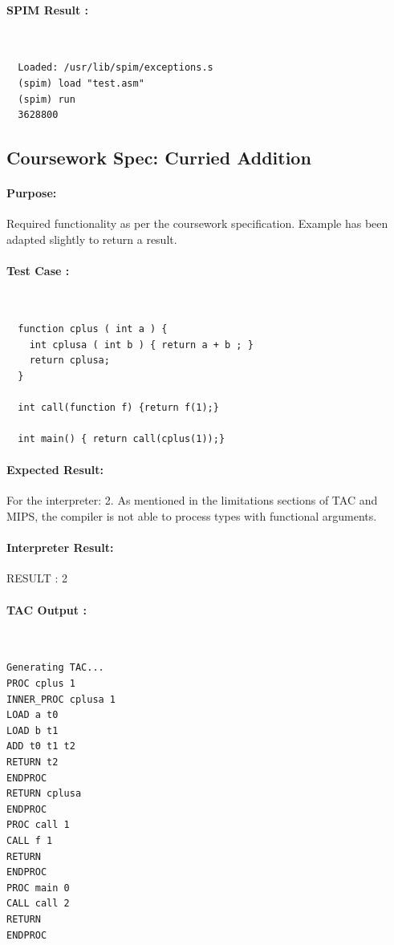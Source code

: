 \documentclass[12pt]{article}
\begin{document}
\paragraph{SPIM Result :}~\\
\begin{lstlisting}
  Loaded: /usr/lib/spim/exceptions.s
  (spim) load "test.asm"
  (spim) run
  3628800
\end{lstlisting}
\subsection{Coursework Spec: Curried Addition}
\paragraph{Purpose:}Required functionality as per the coursework specification. Example has been adapted slightly to return a result.
\paragraph{Test Case :}~\\
\begin{lstlisting}
  function cplus ( int a ) {
    int cplusa ( int b ) { return a + b ; }
    return cplusa;
  }

  int call(function f) {return f(1);}

  int main() { return call(cplus(1));}
\end{lstlisting}
\paragraph{Expected Result:}For the interpreter: 2. As mentioned in the limitations sections of TAC and MIPS, the compiler is not able to process types with functional arguments. 
\paragraph{Interpreter Result:}RESULT : 2
\paragraph{TAC Output : }~\\
\begin{lstlisting}
Generating TAC...
PROC cplus 1
INNER_PROC cplusa 1
LOAD a t0
LOAD b t1
ADD t0 t1 t2
RETURN t2
ENDPROC
RETURN cplusa
ENDPROC
PROC call 1
CALL f 1
RETURN
ENDPROC
PROC main 0
CALL call 2
RETURN
ENDPROC
\end{lstlisting}
\end{document}
